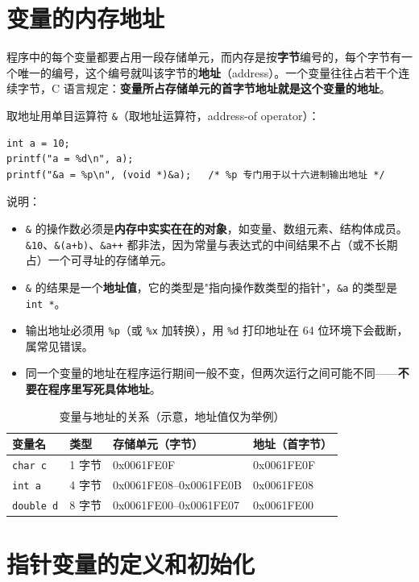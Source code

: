 
\section{变量的内存地址}
程序中的每个变量都要占用一段存储单元，而内存是按\textbf{字节}编号的，每个字节有一个唯一的编号，这个编号就叫该字节的\textbf{地址}（address）。一个变量往往占若干个连续字节，C 语言规定：\textbf{变量所占存储单元的首字节地址就是这个变量的地址}。

取地址用单目运算符 \texttt{\&}（取地址运算符，address-of operator）：
\begin{lstlisting}
int a = 10;
printf("a = %d\n", a);
printf("&a = %p\n", (void *)&a);   /* %p 专门用于以十六进制输出地址 */
\end{lstlisting}
说明：
\begin{itemize}
  \item \texttt{\&} 的操作数必须是\textbf{内存中实实在在的对象}，如变量、数组元素、结构体成员。\texttt{\&10}、\texttt{\&(a+b)}、\texttt{\&a++} 都非法，因为常量与表达式的中间结果不占（或不长期占）一个可寻址的存储单元。
  \item \texttt{\&} 的结果是一个\textbf{地址值}，它的类型是"指向操作数类型的指针"，\texttt{\&a} 的类型是 \texttt{int *}。
  \item 输出地址必须用 \texttt{\%p}（或 \texttt{\%x} 加转换），用 \texttt{\%d} 打印地址在 64 位环境下会截断，属常见错误。
  \item 同一个变量的地址在程序运行期间一般不变，但两次运行之间可能不同——\textbf{不要在程序里写死具体地址}。
\end{itemize}

\begin{table}[htbp]
\centering
\caption{变量与地址的关系（示意，地址值仅为举例）}
\footnotesize
\begin{tabular}{@{}llll@{}}
\toprule
变量名 & 类型 & 存储单元（字节） & 地址（首字节） \\
\midrule
\texttt{char c} & 1 字节 & 0x0061FE0F & 0x0061FE0F \\
\texttt{int a} & 4 字节 & 0x0061FE08--0x0061FE0B & 0x0061FE08 \\
\texttt{double d} & 8 字节 & 0x0061FE00--0x0061FE07 & 0x0061FE00 \\
\bottomrule
\end{tabular}
\end{table}

\section{指针变量的定义和初始化}
